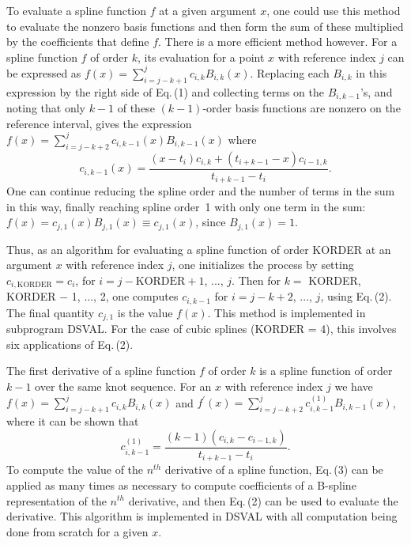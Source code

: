 \documentclass[twoside]{MATH77}
\begin{document}
To evaluate a spline function $f$ at a given argument $x$, one could use
this method to evaluate the nonzero basis functions and then form the sum of
these multiplied by the coefficients that define $f$. There is a more
efficient method however. For a spline function $f$ of order $k$, its
evaluation for a point $x$ with reference index $j$ can be expressed as $%
f(x)=\sum_{i=j-k+1}^jc_{i,k}B_{i,k}(x)$. Replacing each $B_{i,k}$ in this
expression by the right side of Eq.\,(1) and collecting terms on the $%
B_{i,k-1}$'s, and noting that only $k-1$ of these $(k-1)$-order
basis functions are nonzero on the reference interval, gives the expression $%
f(x)=\sum_{i=j-k+2}^jc_{i,k-1}(x)B_{i,k-1}(x)$ where
\begin{equation}
\label{O2}c_{i,k-1}(x)=\frac{\left( x-t_i\right) c_{i,k}+\left(
t_{i+k-1}-x\right) c_{i-1,k}}{t_{i+k-1}-t_i}.
\end{equation}
One can continue reducing the spline order and the number of terms in the
sum in this way, finally reaching spline order~1 with only one term in the
sum: $f(x)=c_{j,1}(x)B_{j,1}(x)\equiv c_{j,1}(x)$, since $B_{j,1}(x)=1.$

Thus, as an algorithm for evaluating a spline function of order KORDER at an
argument $x$ with reference index $j$, one initializes the process by
setting $c_{i,\text{KORDER}} = c_i$, for $i = j-\text{KORDER}+1$, ..., $j$.
Then for $k =$ KORDER, KORDER $-$ 1, ..., 2, one computes $c_{i,k-1}$ for $i
=j-k+2$, ..., $j$, using Eq.\,(2). The final quantity $c_{j,1}$ is the value $%
f(x)$. This method is implemented in subprogram DSVAL. For the case of cubic
splines (KORDER = 4), this involves six applications of Eq.\,(2).

The first derivative of a spline function $f$ of order $k$ is a spline
function of order $k-1$ over the same knot sequence. For an $x$ with
reference index $j$ we have $f(x)=\sum_{i=j-k+1}^jc_{i,k}B_{i,k}(x)$ and $%
f^{\prime }(x)=\sum_{i=j-k+2}^jc_{i,k-1}^{(1)}B_{i,k-1}(x)$, where it
can be shown that
\begin{equation}
\label{O3}c_{i,k-1}^{(1)}=\frac{\left( k-1\right) \left(
c_{i,k}-c_{i-1,k}\right) }{t_{i+k-1}-t_i}.
\end{equation}
To compute the value of the $n^{th}$ derivative of a spline function, Eq.\,(3)
can be applied as many times as necessary to compute coefficients of a
B-spline representation of the $n^{th}$ derivative, and then Eq.\,(2) can be
used to evaluate the derivative. This algorithm is implemented in DSVAL with
all computation being done from scratch for a given $x.$
\end{document}
